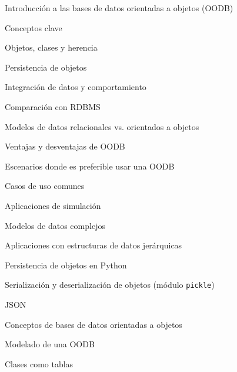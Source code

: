 \begin{longenum}
    \begin{longenum}
        \item Introducción a las bases de datos orientadas a objetos (OODB)
        \begin{longenum}
            \item Conceptos clave
            \begin{longenum}
                \item Objetos, clases y herencia
                \item Persistencia de objetos
                \item Integración de datos y comportamiento
            \end{longenum}
            \item Comparación con RDBMS
            \begin{longenum}
                \item Modelos de datos relacionales vs. orientados a objetos
                \item Ventajas y desventajas de OODB
                \item Escenarios donde es preferible usar una OODB
            \end{longenum}
            \item Casos de uso comunes
            \begin{longenum}
                \item Aplicaciones de simulación
                \item Modelos de datos complejos
                \item Aplicaciones con estructuras de datos jerárquicas
            \end{longenum}
        \end{longenum}
        \item Persistencia de objetos en Python
        \begin{longenum}
            \item Serialización y deserialización de objetos (módulo \texttt{pickle})
            \item JSON
        \end{longenum}
        \item Conceptos de bases de datos orientadas a objetos
        \begin{longenum}
            \item Modelado de una OODB
            \begin{longenum}
                \item Clases como tablas

\end{longenum}
\end{longenum}
\end{longenum}
\end{longenum}
